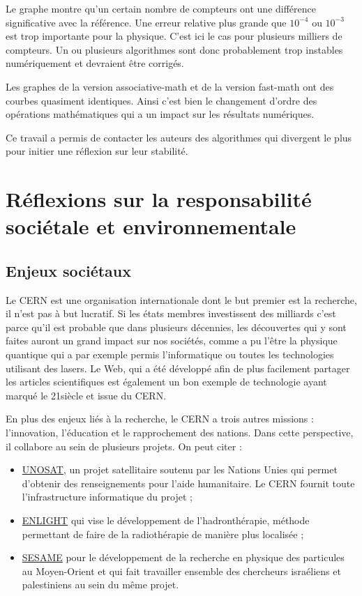 \documentclass[a4paper,11pt]{report}
\begin{document}
Le graphe montre qu'un certain nombre de compteurs ont une différence significative avec la référence.
Une erreur relative plus grande que $10^{-4}$ ou $10^{-3}$ est trop importante pour la physique.
C'est ici le cas pour plusieurs milliers de compteurs.
Un ou plusieurs algorithmes sont donc probablement trop instables numériquement et devraient être corrigés.

Les graphes de la version associative-math et de la version fast-math ont des courbes quasiment identiques.
Ainsi c'est bien le changement d'ordre des opérations mathématiques qui a un impact sur les résultats numériques.

Ce travail a permis de contacter les auteurs des algorithmes qui divergent le plus pour initier une réflexion sur leur stabilité.

\chapter*{Réflexions sur la responsabilité sociétale et environnementale}
\section*{Enjeux sociétaux}
Le CERN est une organisation internationale dont le but premier est la recherche, il n'est pas à but lucratif.
Si les états membres investissent des milliards c'est parce qu'il est probable que dans plusieurs décennies, les découvertes qui y sont faites auront un grand impact sur nos sociétés,
comme a pu l'être la physique quantique qui a par exemple permis l'informatique ou toutes les technologies utilisant des lasers.
Le Web, qui a été développé afin de plus facilement partager les articles scientifiques est également un bon exemple de technologie ayant marqué le 21\ieme siècle et issue du CERN.

En plus des enjeux liés à la recherche, le CERN a trois autres missions : l'innovation, l'éducation et le rapprochement des nations.
Dans cette perspective, il collabore au sein de plusieurs projets. On peut citer :
\begin{itemize}
    \item \href{https://home.cern/tags/unosat}{UNOSAT}, un projet satellitaire soutenu par les Nations Unies qui permet d'obtenir des renseignements pour l'aide humanitaire. Le CERN fournit toute l'infrastructure informatique du projet ;
    \item \href{https://enlight.web.cern.ch/}{ENLIGHT} qui vise le développement de l'hadronthérapie, méthode permettant de faire de la radiothérapie de manière plus localisée ;
    \item \href{https://home.cern/tags/sesame}{SESAME} pour le développement de la recherche en physique des particules au Moyen-Orient et qui fait travailler ensemble des chercheurs israéliens et palestiniens au sein du même projet.
\end{itemize}
\end{document}
